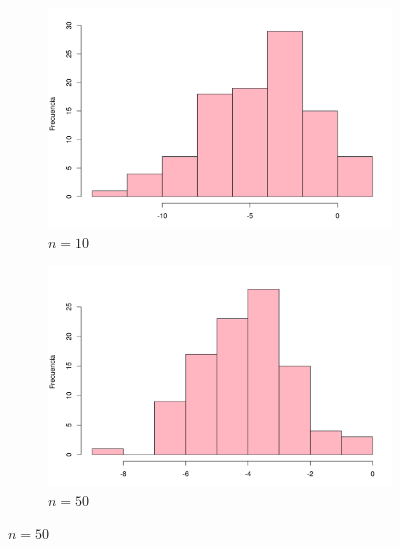 \documentclass[12pt]{article}
\begin{document}
	\begin{figure}
		\begin{subfigure}{\textwidth}
			\centering
			\includegraphics[scale=0.5]{meangap_10.png}
			\caption{$n=10$}
		\end{subfigure}
	
		\begin{subfigure}{\textwidth}
			\centering
			\includegraphics[scale=0.5]{meangap_50.png}
			\caption{$n=50$}
			\label{muestra_50}
		\end{subfigure}
	

\end{figure}
\end{document}
